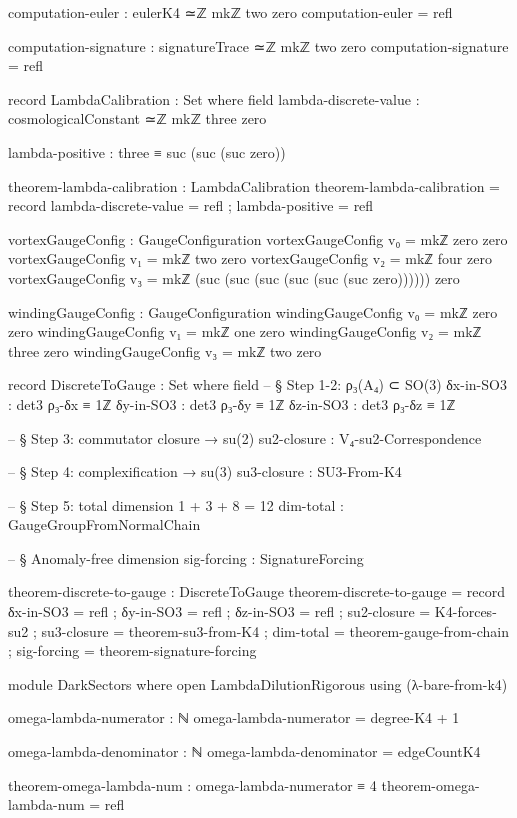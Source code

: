 \documentclass[11pt,a4paper]{book}
\begin{document}
\begin{code}
computation-euler : eulerK4 ≃ℤ mkℤ two zero
computation-euler = refl

computation-signature : signatureTrace ≃ℤ mkℤ two zero
computation-signature = refl

record LambdaCalibration : Set where
  field
    lambda-discrete-value : cosmologicalConstant ≃ℤ mkℤ three zero
    
    lambda-positive : three ≡ suc (suc (suc zero))

theorem-lambda-calibration : LambdaCalibration
theorem-lambda-calibration = record
  { lambda-discrete-value = refl
  ; lambda-positive = refl
  }

vortexGaugeConfig : GaugeConfiguration
vortexGaugeConfig v₀ = mkℤ zero zero
vortexGaugeConfig v₁ = mkℤ two zero
vortexGaugeConfig v₂ = mkℤ four zero
vortexGaugeConfig v₃ = mkℤ (suc (suc (suc (suc (suc (suc zero)))))) zero

windingGaugeConfig : GaugeConfiguration
windingGaugeConfig v₀ = mkℤ zero zero
windingGaugeConfig v₁ = mkℤ one zero
windingGaugeConfig v₂ = mkℤ three zero
windingGaugeConfig v₃ = mkℤ two zero

record DiscreteToGauge : Set where
  field
    -- § Step 1-2: ρ₃(A₄) ⊂ SO(3)
    δx-in-SO3 : det3 ρ₃-δx ≡ 1ℤ
    δy-in-SO3 : det3 ρ₃-δy ≡ 1ℤ
    δz-in-SO3 : det3 ρ₃-δz ≡ 1ℤ

    -- § Step 3: commutator closure → su(2)
    su2-closure   : V₄-su2-Correspondence

    -- § Step 4: complexification → su(3)
    su3-closure   : SU3-From-K4

    -- § Step 5: total dimension 1 + 3 + 8 = 12
    dim-total     : GaugeGroupFromNormalChain

    -- § Anomaly-free dimension
    sig-forcing   : SignatureForcing

theorem-discrete-to-gauge : DiscreteToGauge
theorem-discrete-to-gauge = record
  { δx-in-SO3    = refl
  ; δy-in-SO3    = refl
  ; δz-in-SO3    = refl
  ; su2-closure  = K4-forces-su2
  ; su3-closure  = theorem-su3-from-K4
  ; dim-total    = theorem-gauge-from-chain
  ; sig-forcing  = theorem-signature-forcing
  }

module DarkSectors where
  open LambdaDilutionRigorous using (λ-bare-from-k4)
  
  omega-lambda-numerator : ℕ
  omega-lambda-numerator = degree-K4 + 1
  
  omega-lambda-denominator : ℕ
  omega-lambda-denominator = edgeCountK4
  
  theorem-omega-lambda-num : omega-lambda-numerator ≡ 4
  theorem-omega-lambda-num = refl
  

\end{code}
\end{document}
